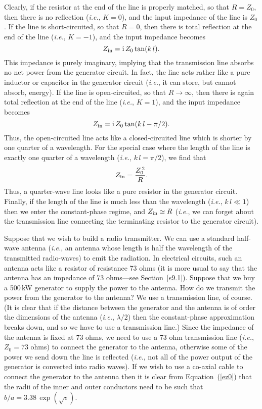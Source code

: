Clearly, if the resistor at the end of the line is properly matched, so that
$R=Z_0$, then there is no reflection ({\em i.e.}, $K= 0$), and the input impedance of
the line is $Z_0$. If the line is short-circuited, so that $R=0$, then there is total
reflection at the end of the line ({\em i.e.}, $K= -1$), and the input impedance becomes
\begin{equation}
Z_{\rm in} = {\rm i} \,Z_0 \tan (k\,l).
\end{equation}
This impedance is purely imaginary, implying that the transmission line absorbs no
net power from the generator circuit. In fact, the line acts rather like a pure
inductor or capacitor in the generator circuit 
({\em i.e.}, it can store, but cannot absorb, energy). If the line
is open-circuited, so that $R\rightarrow \infty$, then there is again
total reflection at the end of the line ({\em i.e.}, $K = 1$), and the input 
impedance becomes
\begin{equation}
Z_{\rm in} = {\rm i}\,Z_0\tan(k\,l-\pi/2).
\end{equation}
Thus, the open-circuited line acts like a closed-circuited line which is shorter by
one quarter of a wavelength. For the special case where the length of the line
is exactly one quarter of a wavelength ({\em i.e.}, $k\,l=\pi/2$), we find that
\begin{equation}\label{e7q}
Z_{\rm in} = \frac{Z_0^{\,2}}{R}.
\end{equation}
Thus, a quarter-wave line looks like a pure resistor in the generator circuit.
Finally, if the length of the line is much less than the wavelength ({\em i.e.}, $k\,l\ll 1$)
then we enter the constant-phase regime, and $Z_{\rm in}\simeq R$ ({\em i.e.}, we can
forget about the transmission line connecting the
terminating  resistor to the generator circuit).

Suppose that we wish to build a radio transmitter. We can use a standard half-wave antenna ({\em i.e.}, an antenna whose length is half the wavelength
of the transmitted radio-waves)
to emit the radiation. In electrical circuits, such an antenna acts like a resistor of resistance
73 ohms (it is more usual to  say that the antenna has an impedance of 73 ohms---see Section~\ref{s9.1}). 
Suppose that we buy a 500\,kW
generator to supply the power to the antenna. How do we transmit
the power from the generator to the antenna? We use a transmission line, of course. 
(It is clear that if the distance between  the generator and the antenna is of
order the dimensions of the antenna ({\em i.e.}, $\lambda/2$) then the constant-phase 
approximation breaks down, and so we have to use a transmission line.)
Since the impedance of the antenna is fixed at 73 ohms, we need to use a
73 ohm transmission line ({\em i.e.}, $Z_0 = 73$ ohms) to connect the generator to
the antenna, otherwise some of the power we send down the line is reflected
({\em i.e.}, not all of the power output of the generator is converted into
radio waves). If we wish to use a co-axial cable to connect the generator to
the antenna then it is clear from Equation~(\ref{ez0}) that the  radii of the
inner and outer conductors need to be such that $b/a = 3.38\,\exp(\sqrt{\epsilon})$.

